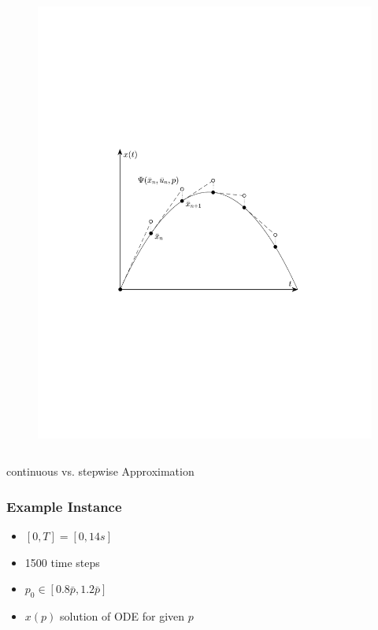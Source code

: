 \begin{frame}
\begin{columns}[t]
\begin{figure}
                \includegraphics[trim=3cm 7cm 3cm 9cm, clip=true, width=\linewidth]{img/stepExplEulerPlot}
            \end{figure}
    \end{columns}
    \begin{center}
        continuous vs. stepwise Approximation
    \end{center}
\end{frame}

\begin{frame}
    \frametitle{Example Instance}
    \begin{itemize}
        \item{$[0,T] = [0,14s]$}
        \item{1500 time steps}
        \item{$p_0 \in [0.8  \bar{p}, 1.2  \bar{p}]$}
        \item{$x(p)$ solution of ODE for given $p$}
    \end{itemize}

\end{frame}

